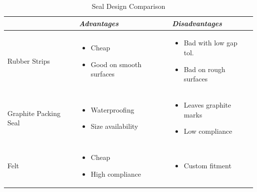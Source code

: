 \documentclass[11pt]{article}
\begin{document}
\begin{itemize}
\begin{table}[htb!]
\caption{Seal Design Comparison}
\label{tab:sealDesign}
\begin{center}
\begin{tabular}{ p{2.5cm} || p{5.25cm} | p{4.75cm} }
& \textit{\textbf{Advantages}} & \textit{\textbf{Disadvantages}} \\
\hline
\hline

Rubber Strips &  
\begin{minipage}[t]{1\textwidth}
	\begin{itemize}
	\setlength\itemsep{-.25em}
	\item Cheap
	\item Good on smooth surfaces
	\vspace{.2cm}
	\end{itemize}
\end{minipage} & 
\begin{minipage}[t]{1\textwidth}
	\begin{itemize}
	\setlength\itemsep{-.25em}
	\item Bad with low gap tol.
	\item Bad on rough surfaces
	\end{itemize}
\end{minipage} \\

\hline

Graphite Packing Seal &  
\begin{minipage}[t]{1\textwidth}
	\begin{itemize}
	\setlength\itemsep{-.25em}
	\item Waterproofing
	\item Size availability
	\end{itemize}
\end{minipage} & 
\begin{minipage}[t]{1\textwidth}
	\begin{itemize}
	\setlength\itemsep{-.25em}
	\item Leaves graphite marks
	\item Low compliance
	\vspace{.2cm}
	\end{itemize}
\end{minipage} \\

\hline

Felt &  
\begin{minipage}[t]{1\textwidth}
	\begin{itemize}
	\setlength\itemsep{-.25em}
	\item Cheap
	\item High compliance
	\end{itemize}
\end{minipage} & 
\begin{minipage}[t]{1\textwidth}
	\begin{itemize}
	\setlength\itemsep{-.25em}
	\item Custom fitment
	\vspace{.2cm}
	\end{itemize}


\end{minipage}
\end{tabular}
\end{center}
\end{table}
\end{itemize}
\end{document}
